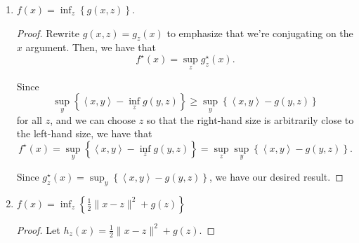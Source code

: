 \documentclass[11pt]{amsart}
\begin{document}
\begin{enumerate}
\begin{enumerate}
\begin{proof}
    \begin{align*}
      f^\star\left(x\right)
      &= \sup_{y} \left\{\left\langle x, y \right\rangle - f(y)\right\} \\
      &= \sup_{y} \left\{\left\langle x, y \right\rangle - g(y - a)\right\} \\
      &= \sup_{y} \left\{\left\langle x, y \right\rangle -
        \left\langle y, b \right\rangle - g(y - a)\right\} \\
      &= \sup_{y} \left\{\left\langle x - b, y \right\rangle - g(y - a)\right\} \\
      &= \sup_{y} \left\{
        \left\langle x - b, a \right\rangle + 
        \left\langle x - b, y - a \right\rangle - g(y - a)\right\} \\
      &= \left\langle x - b, a \right\rangle + \sup_{y} \left\{
        \left\langle x - b, y - a \right\rangle - g(y - a)\right\} \\
      &= \left\langle x - b, a \right\rangle + g^\star(x - b)
    \end{align*}
    since shiftfing by $a$ does not change the supremum.
  \end{proof}
\item $f(x) = \inf_z \left\{g(x,z)\right\}$.
  \begin{proof}
    Rewrite $g(x,z) = g_z(x)$ to emphasize that we're conjugating on the $x$
    argument. Then, we have that
    \begin{equation*}
      \boxed{f^\star\left(x\right) = \sup_z g_z^\star(x).}
    \end{equation*}

    Since
    \begin{equation*}
      \sup_{y} \left\{\left\langle x, y \right\rangle - \inf_zg(y, z)\right\}
      \geq
      \sup_{y} \left\{\left\langle x, y \right\rangle - g(y, z)\right\}
    \end{equation*}
    for all $z$, and we can choose $z$ so that the right-hand size is
    arbitrarily close to the left-hand size, we have that
    \begin{equation*}
      f^\star\left(x\right)
      = \sup_{y} \left\{\left\langle x, y \right\rangle - \inf_zg(y, z)\right\}
      = \sup_z\sup_{y} \left\{\left\langle x, y \right\rangle - g(y, z)\right\}.
    \end{equation*}

    Since
    $g^\star_z(x) = \sup_{y} \left\{\left\langle x, y \right\rangle - g(y,
      z)\right\}$, we have our desired result.        
  \end{proof}
\item $f(x) = \inf_z \left\{\frac{1}{2}\|x-z\|^2 + g(z)\right\}$
  \begin{proof}
    Let $h_z(x) = \frac{1}{2}\|x-z\|^2 + g(z)$.



\end{proof}
\end{enumerate}
\end{enumerate}
\end{document}
